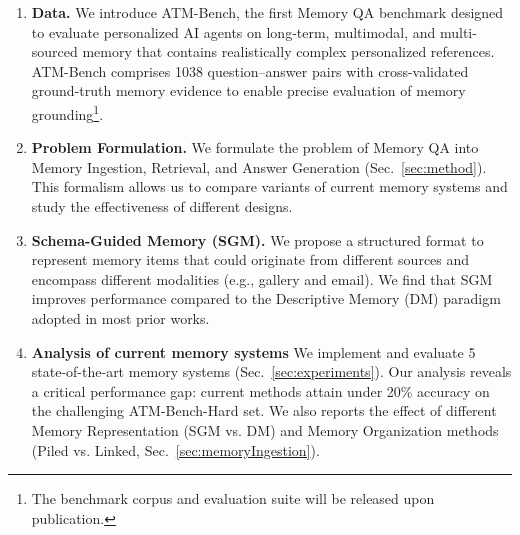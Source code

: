 \documentclass{article}
\theoremstyle{plain}
\theoremstyle{definition}
\theoremstyle{remark}
\begin{document}
\begin{enumerate}
    \item \textbf{Data.} We introduce ATM-Bench, the first Memory QA benchmark designed to evaluate personalized AI agents on long-term, multimodal, and multi-sourced memory that contains realistically complex personalized references. ATM-Bench comprises 1038 question–answer pairs with cross-validated ground-truth memory evidence to enable precise evaluation of memory grounding\footnote{The benchmark corpus and evaluation suite will be released upon publication.}.

    \item \textbf{Problem Formulation.} We formulate the problem of Memory QA into Memory Ingestion, Retrieval, and Answer Generation (Sec.~\ref{sec:method}). This formalism allows us to compare variants of current memory systems and study the effectiveness of different designs.  

    \item \textbf{Schema-Guided Memory (SGM).} We propose a structured format to represent memory items that could originate from different sources and encompass different modalities (e.g., gallery and email). We find that SGM improves performance compared to the Descriptive Memory (DM) paradigm adopted in most prior works.  
    
    \item \textbf{Analysis of current memory systems} We implement and evaluate 5 state-of-the-art memory systems (Sec.~\ref{sec:experiments}). Our analysis reveals a critical performance gap: current methods attain under 20\% accuracy on the challenging ATM-Bench-Hard set. We also reports the effect of different Memory Representation (SGM vs. DM) and Memory Organization methods (Piled vs. Linked, Sec.~\ref{sec:memoryIngestion}). 
\end{enumerate}
\end{document}
